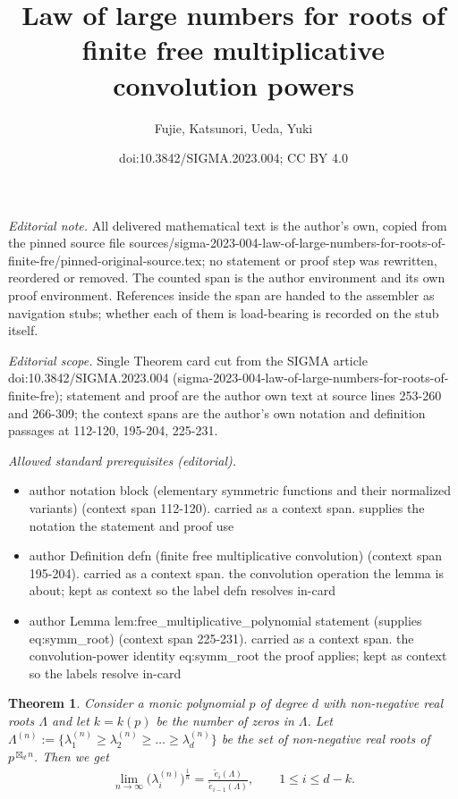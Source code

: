 \documentclass[10pt,a4paper]{article}
\title{Law of large numbers for roots of finite free multiplicative convolution powers}
\author{Fujie, Katsunori, Ueda, Yuki}
\date{doi:10.3842/SIGMA.2023.004; CC BY 4.0}
\numberwithin{equation}{section}
\newtheorem{Theorem}{Theorem}[section]
\begin{document}
\maketitle
\setcounter{section}{3}
\setcounter{subsection}{0}
\setcounter{Theorem}{1}
\setcounter{equation}{1}
\noindent\textit{Editorial note.} All delivered mathematical text is the author's own, copied from the pinned source file sources/sigma-2023-004-law-of-large-numbers-for-roots-of-finite-fre/pinned-original-source.tex; no statement or proof step was rewritten, reordered or removed. The counted span is the author environment and its own proof environment. References inside the span are handed to the assembler as navigation stubs; whether each of them is load-bearing is recorded on the stub itself.\par\medskip
\noindent\textit{Editorial scope.} Single Theorem card cut from the SIGMA article doi:10.3842/SIGMA.2023.004 (sigma-2023-004-law-of-large-numbers-for-roots-of-finite-fre); statement and proof are the author own text at source lines 253-260 and 266-309; the context spans are the author's own notation and definition passages at 112-120, 195-204, 225-231.\par\medskip
\noindent\textit{Allowed standard prerequisites (editorial).}\begin{itemize}
\item author notation block (elementary symmetric functions and their normalized variants) (context span 112-120). carried as a context span. supplies the notation the statement and proof use
\item author Definition defn (finite free multiplicative convolution) (context span 195-204). carried as a context span. the convolution operation the lemma is about; kept as context so the label defn resolves in-card
\item author Lemma lem:free\_multiplicative\_polynomial statement (supplies eq:symm\_root) (context span 225-231). carried as a context span. the convolution-power identity eq:symm\_root the proof applies; kept as context so the labels resolve in-card
\end{itemize}\medskip
\begin{Theorem}\label{thm:LLN}
Consider a monic polynomial $p$ of degree $d$ with non-negative real roots $\Lambda$ and let $k=k(p)$ be the number of zeros in $\Lambda$.
Let $\Lambda^{(n)}:=\big\{\lambda_{1}^{(n)} \ge \lambda_{2}^{(n)} \ge\dots \ge \lambda_{d}^{(n)} \big\} $ be the set of non-negative real roots of $p^{\boxtimes_d n}$.
Then we get
\begin{align*}
\lim_{n\rightarrow\infty}\big(\lambda_{i}^{(n)}\big)^{\frac{1}{n}} =\frac{\widetilde{e}_i(\Lambda)}{\widetilde{e}_{i-1}(\Lambda)}, \qquad 1 \le i \le d-k.
\end{align*}
\end{Theorem}
\end{document}
